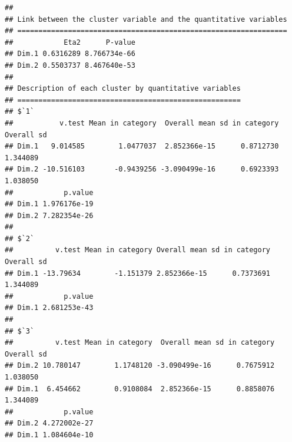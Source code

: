 \documentclass[]{article}
\newenvironment{Shaded}{\begin{snugshade}}{\end{snugshade}}
\newcommand{\KeywordTok}[1]{\textcolor[rgb]{0.13,0.29,0.53}{\textbf{#1}}}
\newcommand{\DataTypeTok}[1]{\textcolor[rgb]{0.13,0.29,0.53}{#1}}
\newcommand{\FloatTok}[1]{\textcolor[rgb]{0.00,0.00,0.81}{#1}}
\newcommand{\StringTok}[1]{\textcolor[rgb]{0.31,0.60,0.02}{#1}}
\newcommand{\OtherTok}[1]{\textcolor[rgb]{0.56,0.35,0.01}{#1}}
\newcommand{\OperatorTok}[1]{\textcolor[rgb]{0.81,0.36,0.00}{\textbf{#1}}}
\newcommand{\NormalTok}[1]{#1}
\begin{document}
\begin{Shaded}
\end{Shaded}

\begin{verbatim}
## 
## Link between the cluster variable and the quantitative variables
## ================================================================
##            Eta2      P-value
## Dim.1 0.6316289 8.766734e-66
## Dim.2 0.5503737 8.467640e-53
## 
## Description of each cluster by quantitative variables
## =====================================================
## $`1`
##           v.test Mean in category  Overall mean sd in category Overall sd
## Dim.1   9.014585        1.0477037  2.852366e-15      0.8712730   1.344089
## Dim.2 -10.516103       -0.9439256 -3.090499e-16      0.6923393   1.038050
##            p.value
## Dim.1 1.976176e-19
## Dim.2 7.282354e-26
## 
## $`2`
##          v.test Mean in category Overall mean sd in category Overall sd
## Dim.1 -13.79634        -1.151379 2.852366e-15      0.7373691   1.344089
##            p.value
## Dim.1 2.681253e-43
## 
## $`3`
##          v.test Mean in category  Overall mean sd in category Overall sd
## Dim.2 10.780147        1.1748120 -3.090499e-16      0.7675912   1.038050
## Dim.1  6.454662        0.9108084  2.852366e-15      0.8858076   1.344089
##            p.value
## Dim.2 4.272002e-27
## Dim.1 1.084604e-10
\end{verbatim}
\end{document}
